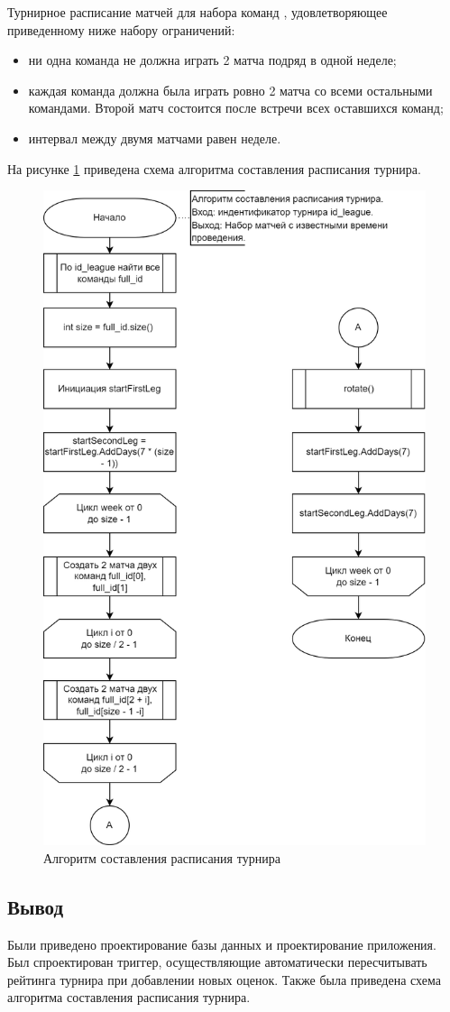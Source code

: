 Турнирное расписание матчей для набора команд , удовлетворяющее приведенному ниже набору ограничений:
\begin{itemize}
	\item ни одна команда не должна играть 2 матча подряд в одной неделе;
	\item каждая команда должна была играть ровно 2 матча со всеми остальными командами. Второй матч состоится после встречи всех оставшихся команд;
	\item интервал между двумя матчами равен неделе.
\end{itemize}

На рисунке \ref{img:schedule} приведена схема алгоритма составления расписания турнира.

\begin{figure}[h]
	\centering
	\includegraphics[height=0.45\textheight]{img/schedule.png}
	\caption{Алгоритм составления расписания турнира}
	\label{img:schedule}
\end{figure}
\clearpage

\subsection*{Вывод}
Были приведено проектирование базы данных и проектирование приложения.
Был спроектирован триггер, осуществляющие автоматически пересчитывать рейтинга турнира при добавлении новых оценок.
Также была приведена схема алгоритма составления расписания турнира.